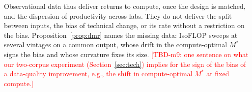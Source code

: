 Observational data thus deliver returns to compute, once the design is matched, and the dispersion of productivity across labs. They
do not deliver the split between inputs, the bias of technical change, or its rate without a restriction on the bias.
Proposition~\ref{prop:dmr}
names the missing data: IsoFLOP sweeps at several vintages on a common output, whose drift in the compute-optimal $M^*$
signs the bias and whose curvature fixes its size. \textcolor{red}{[TBD-m9: one sentence on what our two-corpus
experiment (Section~\ref{sec:tech}) implies for the sign of the bias of a data-quality improvement, e.g., the shift in
compute-optimal $M^*$ at fixed compute.]}
